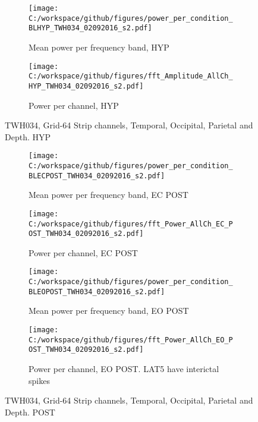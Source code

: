 \documentclass[11pt, onecolumn]{article}
\begin{document}
{%
\begin{figure}[t!] %
\begin{subfigure}{0.48\textwidth}
\texttt{[image: C:/workspace/github/figures/power\_per\_condition\_BLHYP\_TWH034\_02092016\_s2.pdf]}
\caption{Mean power per frequency band, HYP} \label{fig:a}
\end{subfigure}\hspace*{\fill}
\begin{subfigure}{0.48\textwidth}
\texttt{[image: C:/workspace/github/figures/fft\_Amplitude\_AllCh\_HYP\_TWH034\_02092016\_s2.pdf]}
\caption{Power per channel, HYP} \label{fig:b}
\end{subfigure}
\caption{TWH034, Grid-64 Strip channels, Temporal, Occipital, Parietal and Depth. HYP} \label{fig:34HYP}
\end{figure}



\begin{figure}[t!] %
\begin{subfigure}{0.48\textwidth}
\texttt{[image: C:/workspace/github/figures/power\_per\_condition\_BLECPOST\_TWH034\_02092016\_s2.pdf]}
\caption{Mean power per frequency band, EC POST} \label{fig:a}
\end{subfigure}\hspace*{\fill}
\begin{subfigure}{0.48\textwidth}
\texttt{[image: C:/workspace/github/figures/fft\_Power\_AllCh\_EC\_POST\_TWH034\_02092016\_s2.pdf]}
\caption{Power per channel, EC POST} \label{fig:b}
\end{subfigure}

\medskip
\begin{subfigure}{0.48\textwidth}
\texttt{[image: C:/workspace/github/figures/power\_per\_condition\_BLEOPOST\_TWH034\_02092016\_s2.pdf]}
\caption{Mean power per frequency band, EO POST} \label{fig:a}
\end{subfigure}\hspace*{\fill}
\begin{subfigure}{0.48\textwidth}
\texttt{[image: C:/workspace/github/figures/fft\_Power\_AllCh\_EO\_POST\_TWH034\_02092016\_s2.pdf]}
\caption{Power per channel, EO POST. LAT5 have interictal spikes} \label{fig:b}
\end{subfigure}
\caption{TWH034, 
 Grid-64 Strip channels, Temporal, Occipital, Parietal and Depth. POST} \label{fig:38PRE}
\end{figure}


}
\end{document}
